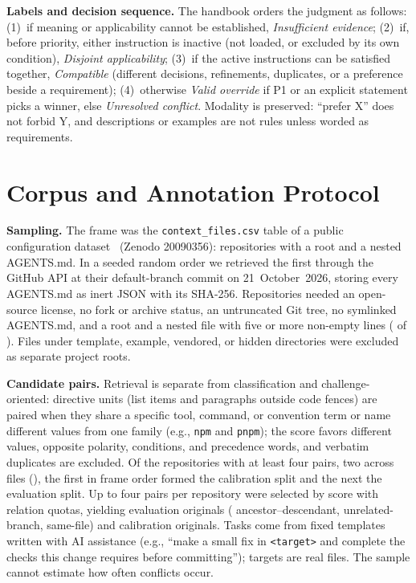 \textbf{Labels and decision sequence.} The handbook orders the judgment as follows: (1)~if meaning or applicability
cannot be established, \emph{Insufficient evidence}; (2)~if, before priority, either instruction is inactive (not
loaded, or excluded by its own condition), \emph{Disjoint applicability}; (3)~if the active instructions can be
satisfied together, \emph{Compatible} (different decisions, refinements, duplicates, or a preference beside a
requirement); (4)~otherwise \emph{Valid override} if P1 or an explicit statement picks a winner, else
\emph{Unresolved conflict}. Modality is preserved: ``prefer X'' does not forbid Y, and descriptions or examples are not
rules unless worded as requirements.

\section{Corpus and Annotation Protocol}\label{sec:corpus}
\textbf{Sampling.} The frame was the \texttt{context\_files.csv} table of a public configuration
dataset~\cite{galster2026dataset} (Zenodo 20090356): \NFrame{} repositories with a root and a nested AGENTS.md. In a
seeded random order we retrieved the first \NRetrieved{} through the GitHub API at their default-branch commit on
21~October~2026, storing every AGENTS.md as inert JSON with its SHA-256. Repositories needed an open-source license, no
fork or archive status, an untruncated Git tree, no symlinked AGENTS.md, and a root and a nested file with five or more
non-empty lines (\NSnapshotEligible{} of \NRetrieved{}). Files under template, example, vendored, or hidden directories
were excluded as separate project roots.

\textbf{Candidate pairs.} Retrieval is separate from classification and challenge-oriented: directive units (list items
and paragraphs outside code fences) are paired when they share a specific tool, command, or convention term or name
different values from one family (e.g., \texttt{npm} and \texttt{pnpm}); the score favors different values, opposite
polarity, conditions, and precedence words, and verbatim duplicates are excluded. Of the repositories with at least four
pairs, two across files (\NPairEligible{}), the first \NCalReposWord{} in frame order formed the calibration split and
the next \NEvalReposWord{} the evaluation split. Up to four pairs per repository were selected by score with relation
quotas, yielding \NOriginals{} evaluation originals (\NRelAncestor{} ancestor--descendant, \NRelUnrelated{}
unrelated-branch, \NRelSameFile{} same-file) and \NCalOriginals{} calibration originals. Tasks come from fixed templates
written with AI assistance (e.g., ``make a small fix in \texttt{<target>} and complete the checks this change requires
before committing''); targets are real files. The sample cannot estimate how often conflicts occur.


